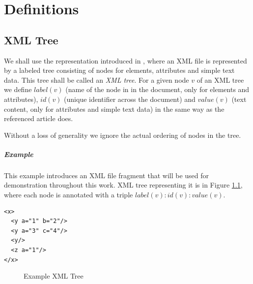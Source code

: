 \chapter{Definitions}
\label{chapter-definitions}

\section{XML Tree}

We shall use the representation introduced in \cite{fidax}, where an XML file is represented by a labeled tree consisting of nodes for elements, attributes and simple text data. This tree shall be called an \textit{XML tree}. For a given node $v$ of an XML tree we define $label(v)$ (name of the node in in the document, only for elements and attributes), $id(v)$ (unique identifier across the document) and $value(v)$ (text content, only for attributes and simple text data) in the same way as the referenced article does.

Without a loss of generality we ignore the actual ordering of nodes in the tree.

\paragraph{Example}

This example introduces an XML file fragment that will be used for demonstration throughout this work. XML tree representing it is in Figure \ref{image-definitions-example-xml-tree}, where each node is annotated with a triple $label(v) : id(v) : value(v)$.

\begin{verbatim}
<x>
  <y a="1" b="2"/>
  <y a="3" c="4"/>
  <y/>
  <z a="1"/>
</x>
\end{verbatim}

\begin{figure}
  \caption{Example XML Tree}
  \label{image-definitions-example-xml-tree}
  \centering
\end{figure}

